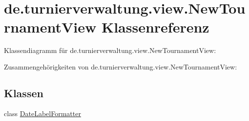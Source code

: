 \hypertarget{classde_1_1turnierverwaltung_1_1view_1_1_new_tournament_view}{}\section{de.\+turnierverwaltung.\+view.\+New\+Tournament\+View Klassenreferenz}
\label{classde_1_1turnierverwaltung_1_1view_1_1_new_tournament_view}


Klassendiagramm für de.\+turnierverwaltung.\+view.\+New\+Tournament\+View\+:


Zusammengehörigkeiten von de.\+turnierverwaltung.\+view.\+New\+Tournament\+View\+:
\subsection*{Klassen}
\begin{DoxyCompactItemize}
\item 
class \hyperlink{classde_1_1turnierverwaltung_1_1view_1_1_new_tournament_view_1_1_date_label_formatter}{Date\+Label\+Formatter}
\end{DoxyCompactItemize}
